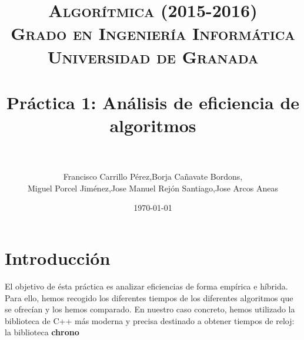 

\title{	
\normalfont \normalsize 
\textsc{{\bf Algorítmica (2015-2016)} \\ Grado en Ingeniería Informática \\ Universidad de Granada} \\ [25pt] %
\horrule{0.5pt} \\[0.4cm] %
\huge Práctica 1: Análisis de eficiencia de algoritmos \\ %
\horrule{2pt} \\[0.5cm] %
}

\author{Francisco Carrillo Pérez,Borja Cañavate Bordons, \\Miguel Porcel Jiménez,Jose Manuel Rejón Santiago,Jose Arcos Aneas} %

\date{\normalsize\today} %




\maketitle %

\newpage %

\tableofcontents %

\listoffigures

\listoftables

\newpage

\section{Introducción }

El objetivo de ésta práctica es analizar eficiencias de forma empírica e híbrida.
Para ello, hemos recogido los diferentes tiempos de los diferentes algoritmos que se ofrecían y los hemos comparado.
En nuestro caso concreto, hemos utilizado la biblioteca de C++ más moderna y precisa destinado a obtener tiempos de reloj: la biblioteca \textbf{chrono}

